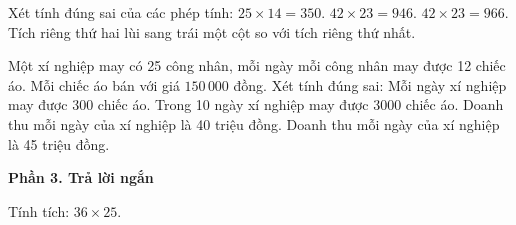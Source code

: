\begin{ex} %
Xét tính đúng sai của các phép tính:
\choiceTF
{\True $25 \times 14 = 350$.}
{$42 \times 23 = 946$.}
{\True $42 \times 23 = 966$.}
{\True Tích riêng thứ hai lùi sang trái một cột so với tích riêng thứ nhất.}
\end{ex}

\begin{ex} %
Một xí nghiệp may có 25 công nhân, mỗi ngày mỗi công nhân may được 12 chiếc áo. Mỗi chiếc áo bán với giá $150\,000$ đồng. Xét tính đúng sai:
\choiceTF
{\True Mỗi ngày xí nghiệp may được 300 chiếc áo.}
{\True Trong 10 ngày xí nghiệp may được 3000 chiếc áo.}
{Doanh thu mỗi ngày của xí nghiệp là 40 triệu đồng.}
{\True Doanh thu mỗi ngày của xí nghiệp là 45 triệu đồng.}
\end{ex}

\textbf{Phần 3. Trả lời ngắn}

\begin{ex} %
Tính tích: $36 \times 25$.
\end{ex}

